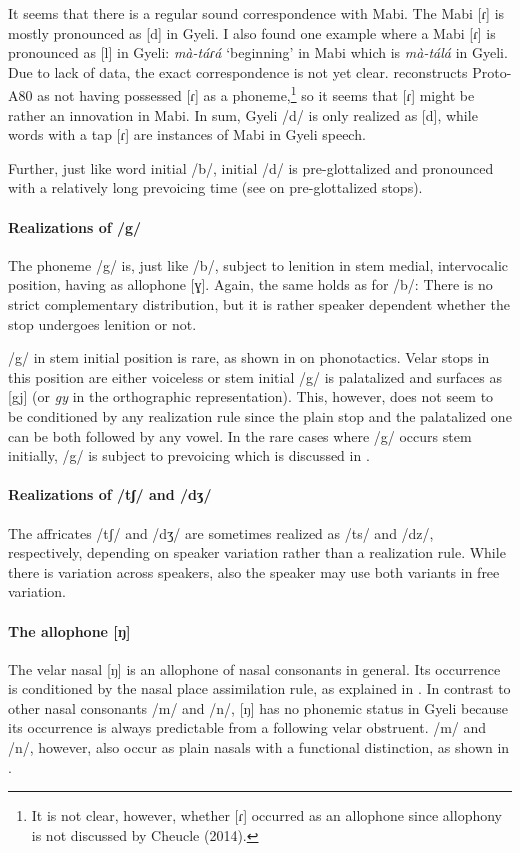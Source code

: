 It seems that there is a regular sound correspondence with Mabi. The Mabi [ɾ] is mostly pronounced as [d] in Gyeli. I also found one example where a Mabi [ɾ] is pronounced as [l] in Gyeli:  {\itshape mà-táɾá} `beginning' in Mabi which is {\itshape mà-tálá} in Gyeli. Due to lack of data, the exact correspondence is not yet clear. \citet[432]{cheucle2014} reconstructs Proto-A80 as not having possessed [ɾ] as a phoneme,\footnote{It is not clear, however, whether  [ɾ] occurred as an allophone since allophony is not discussed by Cheucle (2014).} so it seems that [ɾ] might be rather an innovation in Mabi. In sum, Gyeli /d/ is only realized as [d], while words with a tap [ɾ] are instances of Mabi in Gyeli speech.

Further, just like word initial /b/, initial /d/ is pre-glottalized and pronounced with a relatively long prevoicing time (see  on pre-glottalized stops).



\paragraph{Realizations of /g/} The phoneme /g/ is, just like /b/, subject to lenition in stem medial, intervocalic position, having as allophone [ɣ]. Again, the same holds as for /b/: There is no strict complementary distribution, but it is rather speaker dependent whether the stop undergoes lenition or not.

/g/ in stem initial position is rare, as shown in  on phonotactics. Velar stops in this position are either voiceless or stem initial /g/ is palatalized and surfaces as [gj] (or {\itshape gy} in the orthographic representation). This, however, does not seem to be conditioned by any realization rule since the plain stop and the palatalized one can be both followed by any vowel. In the rare cases where /g/ occurs stem initially, /g/ is subject to prevoicing which is discussed in .

\paragraph{Realizations of /tʃ/ and /dʒ/} The affricates /tʃ/ and /dʒ/ are sometimes realized as /ts/ and /dz/, respectively, depending on speaker variation rather than a realization rule. While there is variation across speakers, also the speaker may use both variants in free variation. 


\paragraph{The allophone {[}ŋ{]}} The velar nasal [ŋ] is an allophone of nasal consonants in general. Its occurrence is conditioned by the nasal place assimilation rule, as explained in . In contrast to other nasal consonants /m/ and /n/, [ŋ] has no phonemic status in Gyeli because its occurrence is always predictable from a following velar obstruent. /m/ and /n/, however, also occur as plain nasals with a functional distinction, as shown in .

